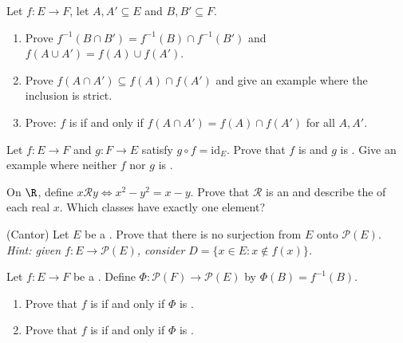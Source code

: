 \begin{exercise}[$\star\star$]\label{exo:b1:logic:8}
Let $f \colon E \to F$, let $A, A' \subseteq E$ and $B, B' \subseteq
F$.
\begin{enumerate}
  \item Prove $f^{-1}(B \cap B') = f^{-1}(B) \cap f^{-1}(B')$ and
        $f(A \cup A') = f(A) \cup f(A')$.
  \item Prove $f(A \cap A') \subseteq f(A) \cap f(A')$ and give an
        example where the inclusion is strict.
  \item Prove: $f$ is  if and only if $f(A \cap A') = f(A)
        \cap f(A')$ for all $A, A'$.
\end{enumerate}
\end{exercise}

\begin{exercise}[$\star\star$]\label{exo:b1:logic:9}
Let $f \colon E \to F$ and $g \colon F \to E$ satisfy $g \circ f =
\mathrm{id}_E$. Prove that $f$ is  and $g$ is .
Give an example where neither $f$ nor $g$ is .
\end{exercise}

\begin{exercise}[$\star\star$]\label{exo:b1:logic:10}
On $\R$, define $x \mathbin{\mathcal{R}} y \iff x^2 - y^2 = x - y$.
Prove that $\mathcal{R}$ is an  and describe the
 of each real $x$. Which classes have exactly one
element?
\end{exercise}

\begin{exercise}[$\star\star\star$]\label{exo:b1:logic:11}
(Cantor) Let $E$ be a . Prove that there is no surjection from $E$
onto $\mathcal{P}(E)$. \emph{Hint: given $f \colon E \to
\mathcal{P}(E)$, consider $D = \{x \in E : x \notin f(x)\}$.}
\end{exercise}

\begin{exercise}[$\star\star\star$]\label{exo:b1:logic:12}
Let $f \colon E \to F$ be a . Define $\Phi \colon \mathcal{P}(F)
\to \mathcal{P}(E)$ by $\Phi(B) = f^{-1}(B)$.
\begin{enumerate}
  \item Prove that $f$ is  if and only if $\Phi$ is
        .
  \item Prove that $f$ is  if and only if $\Phi$ is
        .
\end{enumerate}
\end{exercise}


